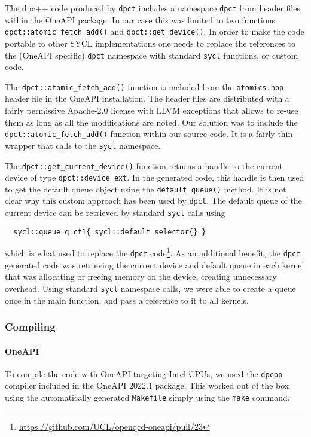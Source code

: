 \documentclass[../main]{subfiles}
\begin{document}
The dpc++ code produced by \texttt{dpct} includes a namespace \texttt{dpct} from header files within the OneAPI package.
In our case this was limited to two functions \verb!dpct::atomic_fetch_add()! and \verb!dpct::get_device()!.
In order to make the code portable to other SYCL implementations one needs to replace the references to the (OneAPI specific) \texttt{dpct} namespace with standard \texttt{sycl} functions, or custom code.

The \verb!dpct::atomic_fetch_add()! function is included from the \texttt{atomics.hpp} header file in the OneAPI installation.
The header files are distributed with a fairly permissive Apache-2.0 license with LLVM exceptions that allows to re-use them as long as all the modifications are noted.
Our solution was to include the \verb!dpct::atomic_fetch_add()! function within our source code.
It is a fairly thin wrapper that calls to the \texttt{sycl} namespace.

The \verb!dpct::get_current_device()! function returns a handle to the current device of type \verb #dpct::device_ext#.
In the generated code, this handle is then used to get the default queue object using the \verb #default_queue()# method.
It is not clear why this custom approach has been used by \texttt{dpct}.
The default queue of the current device can be retrieved by standard \texttt{sycl} calls using
\begin{verbatim}
  sycl::queue q_ct1{ sycl::default_selector{} }
\end{verbatim}
which is what used to replace the \texttt{dpct} code\footnote{\url{https://github.com/UCL/openqcd-oneapi/pull/23}}.
As an additional benefit, the \texttt{dpct} generated code was retrieving the current device and default queue in each kernel that was allocating or freeing memory on the device, creating unnecessary overhead.
Using standard \texttt{sycl} namespace calls, we were able to create a queue once in the main function, and pass a reference to it to all kernels.

\subsubsection{Compiling}\label{sec:openqcd_compiling}

\paragraph{OneAPI}

To compile the code with OneAPI targeting Intel CPUs, we used the \texttt{dpcpp} compiler included in the OneAPI 2022.1 package.
This worked out of the box using the automatically generated \texttt{Makefile} simply using the \texttt{make} command.
\end{document}
